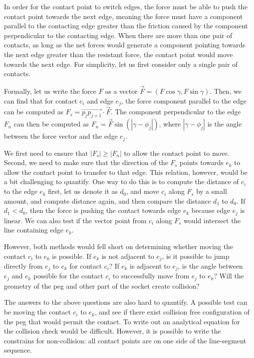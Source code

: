 \documentclass[11p]{article}
\begin{document}
In order for the contact point to switch edges, the force must be able to push the contact point towards the next edge, meaning the force must have a component parallel to the contacting edge greater than the friction caused by the component perpendicular to the contacting edge. When there are more than one pair of contacts, as long as the net forces would generate a component pointing towards the next edge greater than the resistant force, the contact point would move towards the next edge. For simplicity, let us first consider only a single pair of contacts. 

Formally, let us write the force $F$ as a vector $\overrightarrow{F} = (F\cos{\gamma}, F\sin{\gamma})$. Then, we can find that for contact $c_i$ and edge $e_j$, the force component parallel to the edge can be computed as $F_s = \overrightarrow{p_jp_{j+1}}\cdot\overrightarrow{F}$. The component perpendicular to the edge $F_n$ can then be computed as $F_n = \overrightarrow{F}\sin(|\gamma-\phi_j|)$, where $|\gamma-\phi_j|$ is the angle between the force vector and the edge $e_j$. 

We first need to ensure that $|F_s| \geq |F_n|$ to allow the contact point to move. Second, we need to make sure that the direction of the $F_s$ points towards $e_k$ to allow the contact point to transfer to that edge. This relation, however, would be a bit challenging to quantify. One way to do this is to compute the distance of $c_i$ to the edge $e_k$ first, let us denote it as $d_0$, and move $c_i$ along $F_s$ by a small amount, and compute distance again, and then compare the distance $d_1$ to $d_0$. If $d_1 < d_0$, then the force is pushing the contact towards edge $e_k$ because edge $e_j$ is linear. We can also test if the vector point from $c_i$ along $F_s$ would intersect the line containing edge $e_k$. 

However, both methods would fell short on determining whether moving the contact $c_i$ to $e_k$ is possible. If $e_k$ is not adjacent to $e_j$, is it possible to jump directly from $e_j$ to $e_k$ for contact $c_i$? If $e_k$ is adjacent to $e_j$, is the angle between $e_j$ and $e_k$ possible for the contact $c_i$ to successfully move from $e_j$ to $e_k$? Will the geometry of the peg and other part of the socket create collision? 

The answers to the above questions are also hard to quantify. A possible test can be moving the contact $c_i$ to $e_k$, and see if there exist collision free configuration of the peg that would permit the contact. To write out an analytical equation for the collision check would be difficult. However, it is possible to write the constrains for non-collision: all contact points are on one side of the line-segment sequence. 
\end{document}
